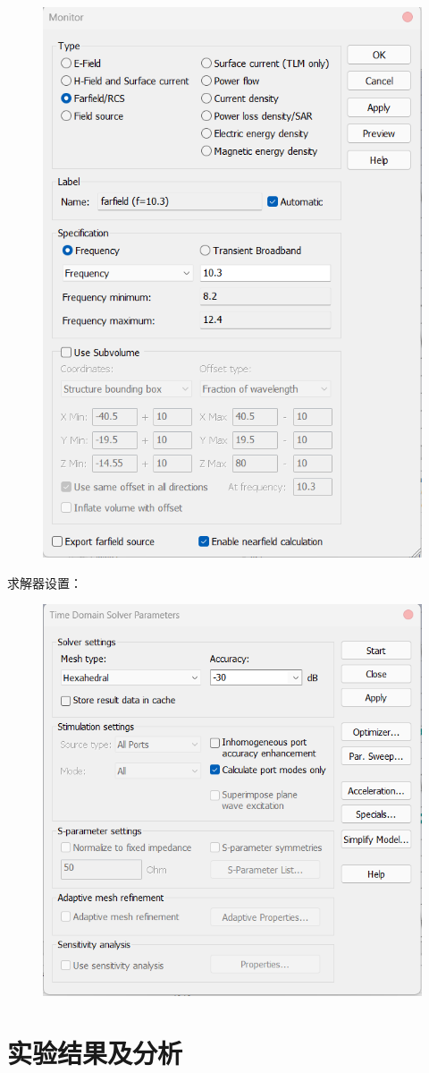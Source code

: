 \documentclass{source/Report}
\begin{document}
\begin{figure}[H]
    \begin{center}
        \includegraphics[width=0.45\linewidth]{pic/cb2_p11.png}
        \caption{}
    \end{center}
\end{figure}
求解器设置：
\begin{figure}[H]
    \begin{center}
        \includegraphics[width=0.8\linewidth]{pic/cb2_p12.png}
        \caption{}
    \end{center}
\end{figure}
\section{实验结果及分析}
\end{document}
